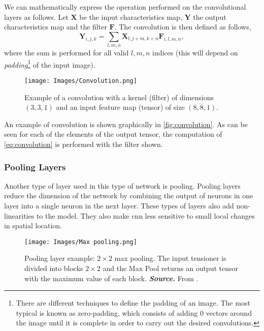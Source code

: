 We can mathematically express the operation performed on the convolutional
layers as follows. Let \(\mathbf{X}\) be the input characteristics map,
\(\mathbf{Y}\) the output characteristics map and the filter
\(\mathbf{F}\). The convolution is then defined as follows,
\begin{equation} \label{eq:convolution}
  \mathbf{Y}_{i, j, k} =
  \sum_{l, m, n} \mathbf{X}_{l, j + m, k + n}\mathbf{F}_{i, l, m, n},
\end{equation}
where the sum is performed for all valid \(l, m, n\) indices (this will depend
on \emph{padding}\footnote{There are different techniques to define the
  padding of an image. The most typical is known as zero-padding, which
  consists of adding 0 vectors around the image until it is complete in order
  to carry out the desired convolutions.} of the input image).

\begin{figure}[ht]
  \centering
  \texttt{[image: Images/Convolution.png]}
  \caption[Example of a convolution]{Example of a convolution with a kernel
    (filter) of dimensions \((3, 3, 1)\) and an input feature map (tensor) of
    size \((8, 8, 1)\).}
  \label{fig:convolution}
\end{figure}

An example of convolution is shown graphically in \vref{fig:convolution}. As
can be seen for each of the elements of the output tensor, the computation of
\vref{eq:convolution} is performed with the filter shown.

\subsubsection{Pooling Layers}
Another type of layer used in this type of network is pooling. Pooling layers
reduce the dimension of the network by combining the output of neurons in one
layer into a single neuron in the next layer. These types of layers also add
non-linearities to the model. They also make \gls{cnn} less sensitive to small
local changes in spatial location.

\begin{figure}[ht]
  \centering
  \texttt{[image: Images/Max pooling.png]}
  \caption[Pooling layer example: max pooling]{Pooling layer example:
    \(2 \times 2\) max pooling. The input tensioner is divided into blocks
    \(2 \times 2\) and the Max Pool returns an output tensor with the maximum
    value of each block. \textbf{\textsl{Source.}} From
    .}\label{fig:max-pool}
\end{figure}


